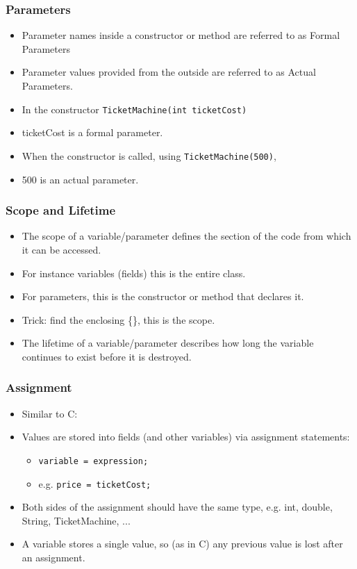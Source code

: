 \documentclass{beamer}
\begin{document}
\begin{frame}[fragile]
\frametitle{Parameters}
\begin{itemize}
\item Parameter names inside a constructor or method are referred to as \alert{Formal Parameters}
\item Parameter values provided from the outside are referred to as \alert{Actual Parameters}.
\item In the constructor \lstinline!TicketMachine(int ticketCost)! 
\item ticketCost is a 
formal parameter. 
\item When the constructor is called, using \lstinline!TicketMachine(500)!, 
\item 500 is an actual parameter.
\end{itemize}
\end{frame}

\begin{frame}
\frametitle{Scope and Lifetime}
\begin{itemize}
\item The \alert{scope} of a variable/parameter defines the section of the code from which it can be accessed.
\item For instance variables (fields) this is the entire class.
\item For parameters, this is the constructor or method that declares it. 
\item Trick: find the enclosing \{\}, this is the scope. 
\item The \alert{lifetime} of a variable/parameter describes how long the variable continues to exist before it is destroyed.
\end{itemize}
\end{frame}

\begin{frame}[fragile]
\frametitle{Assignment}
\begin{itemize}
\item Similar to C:
\item Values are stored into fields (and other variables) via \alert{assignment} statements:
\begin{itemize}
\item \lstinline!variable = expression;!
\item e.g. \lstinline!price = ticketCost;!
\end{itemize}
\item Both sides of the assignment should have the same type, e.g. int, double, String, TicketMachine, ...
\item A variable stores a single value, so (as in C) any previous value is lost after an assignment.
\end{itemize}
\end{frame}
\end{document}
